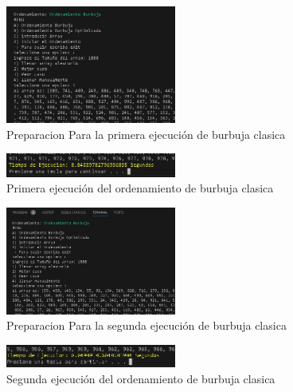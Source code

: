 \documentclass[journal]{IEEEtran}
\begin{document}
  \begin{figure}[H]
    \centering
    \begin{adjustbox}{clip=false}
      \includegraphics[width=0.5\textwidth]{8.PNG}
    \end{adjustbox}
    \caption{Preparacion Para la primera ejecución de burbuja clasica}
  \end{figure}
  \begin{figure}[H]
    \centering
    \begin{adjustbox}{clip=false}
      \includegraphics[width=0.5\textwidth]{9.PNG}
    \end{adjustbox}
    \caption{Primera ejecución del ordenamiento de burbuja clasica}
  \end{figure}
  \begin{figure}[H]
    \centering
    \begin{adjustbox}{clip=false}
      \includegraphics[width=0.5\textwidth]{10.PNG}
    \end{adjustbox}
    \caption{Preparacion Para la segunda ejecución de burbuja clasica}
  \end{figure}
  \begin{figure}[H]
    \centering
    \begin{adjustbox}{clip=false}
      \includegraphics[width=0.5\textwidth]{11.PNG}
    \end{adjustbox}
    \caption{Segunda ejecución del ordenamiento de burbuja clasica}
  \end{figure}
\end{document}
